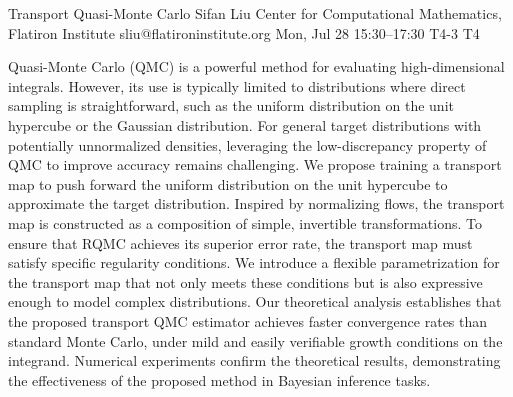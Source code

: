 \begin{talk}
  {Transport Quasi-Monte Carlo}%
  {Sifan Liu}%
  {Center for Computational Mathematics, Flatiron Institute}%
  {sliu@flatironinstitute.org}%
  {}%
  {}%
  {Mon, Jul 28 15:30–17:30}%
  {T4-3}%
  {T4}%
  {}%
  
				
			
Quasi-Monte Carlo (QMC) is a powerful method for evaluating high-dimensional integrals. However, its use is typically limited to distributions where direct sampling is straightforward, such as the uniform distribution on the unit hypercube or the Gaussian distribution. For general target distributions with potentially unnormalized densities, leveraging the low-discrepancy property of QMC to improve accuracy remains challenging. We propose training a transport map to push forward the uniform distribution on the unit hypercube to approximate the target distribution. Inspired by normalizing flows, the transport map is constructed as a composition of simple, invertible transformations. To ensure that RQMC achieves its superior error rate, the transport map must satisfy specific regularity conditions. We introduce a flexible parametrization for the transport map that not only meets these conditions but is also expressive enough to model complex distributions. Our theoretical analysis establishes that the proposed transport QMC estimator achieves faster convergence rates than standard Monte Carlo, under mild and easily verifiable growth conditions on the integrand. Numerical experiments confirm the theoretical results, demonstrating the effectiveness of the proposed method in Bayesian inference tasks.


\medskip


\end{talk}

